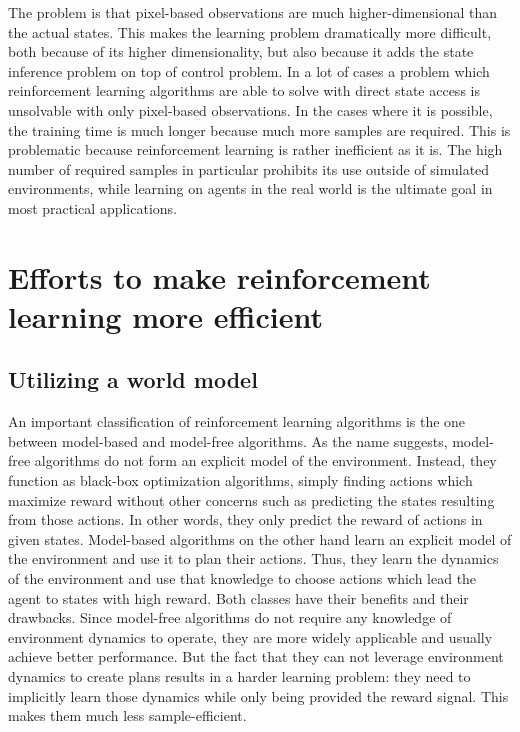 The problem is that pixel-based observations are much higher-dimensional than
the actual states.
This makes the learning problem dramatically more difficult, both because
of its higher dimensionality, but also because it adds the state inference problem
on top of control problem.
In a lot of cases a problem which reinforcement learning algorithms are able 
to solve with direct state access is unsolvable with only pixel-based observations. 
In the cases where it is possible, the training time is much longer because much
more samples are required.
This is problematic because reinforcement learning is rather inefficient as it is.
The high number of required samples in particular prohibits its use
outside of simulated environments, while learning on agents in the real world
is the ultimate goal in most practical applications.

\section{Efforts to make reinforcement learning more efficient}
\label{efforts-in-making-rl-efficient}
\subsection{Utilizing a world model}
An important classification of reinforcement learning algorithms is the one between
model-based and model-free algorithms.
As the name suggests, model-free algorithms do not form an explicit model of the environment.
Instead, they function as black-box optimization algorithms, simply finding actions which maximize
reward without other concerns such as predicting the states resulting from those actions.
In other words, they only predict the reward of actions in given states.
Model-based algorithms on the other hand learn an explicit model of the environment
and use it to plan their actions.
Thus, they learn the dynamics of the environment and use that knowledge to choose actions
which lead the agent to states with high reward.
Both classes have their benefits and their drawbacks.
Since model-free algorithms do not require any knowledge of environment dynamics
to operate, they are more widely applicable and usually achieve better performance.
But the fact that they can not leverage environment dynamics to create plans results in  
a harder learning problem: they need to implicitly learn those dynamics
while only being provided the reward signal. 
This makes them much less sample-efficient.\\

